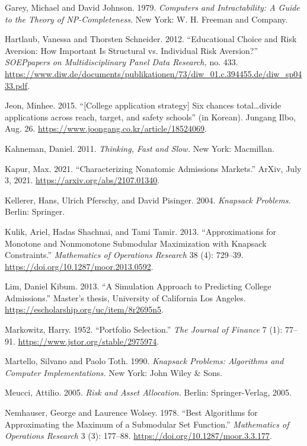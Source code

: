 \documentclass[11pt]{article} %
\theoremstyle{definition}
\theoremstyle{definition}
\begin{document}
Garey, Michael and David Johnson. 1979. \emph{Computers and Intractability: A Guide to the Theory of NP-Completeness.} New York: W. H. Freeman and Company. 

Hartlaub, Vanessa and Thorsten Schneider. 2012. “Educational Choice and Risk Aversion: How Important Is Structural vs. Individual Risk Aversion?” \emph{SOEPpapers on Multidisciplinary Panel Data Research,} no. 433. \url{https://www.diw.de/documents/publikationen/73/diw_01.c.394455.de/diw_sp0433.pdf}.

\ifen Jeon, Minhee. 2015. ``[College application strategy] Six chances total\dots divide applications across reach, target, and safety schools'' (in Korean). Jungang Ilbo, Aug. 26. \url{https://www.joongang.co.kr/article/18524069}.\fi

Kahneman, Daniel. 2011. \emph{Thinking, Fast and Slow.} New York: Macmillan.

Kapur, Max. 2021. ``Characterizing Nonatomic Admissions Markets.'' ArXiv, July 3, 2021. \url{https://arxiv.org/abs/2107.01340}. 

Kellerer, Hans, Ulrich Pferschy, and David Pisinger. 2004. \emph{Knapsack Problems.} Berlin: Springer.

Kulik, Ariel, Hadas Shachnai, and Tami Tamir. 2013. ``Approximations for Monotone and Nonmonotone Submodular Maximization with Knapsack Constraints.'' \emph{Mathematics of Operations Research} 38 (4): 729--39. \url{https://doi.org/10.1287/moor.2013.0592}.

Lim, Daniel Kibum. 2013. ``A Simulation Approach to Predicting College Admissions.'' Master's thesis, University of California Los Angeles. \url{https://escholarship.org/uc/item/8r2695n5}.

Markowitz, Harry. 1952. ``Portfolio Selection.'' \emph{The Journal of Finance} 7 (1): 77--91. \url{https://www.jstor.org/stable/2975974}.

Martello, Silvano and Paolo Toth. 1990. \emph{Knapsack Problems: Algorithms and Computer Implementations.} New York: John Wiley \& Sons. 

Meucci, Attilio. 2005. \emph{Risk and Asset Allocation.} Berlin: Springer-Verlag, 2005. 

Nemhauser, George and Laurence Wolsey. 1978. ``Best Algorithms for Approximating the Maximum of a Submodular Set Function.'' \emph{Mathematics of Operations Research} 3 (3): 177--88. \url{https://doi.org/10.1287/moor.3.3.177}.
\end{document}
